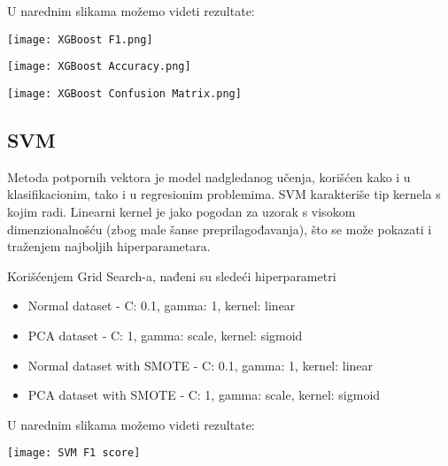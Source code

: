 \documentclass[a4paper]{article}
\begin{document}
        U narednim slikama možemo videti rezultate:

        \begin{center}
            \label{im:XGBoost F1 score}
            \texttt{[image: XGBoost F1.png]}
        \end{center}
        
        \begin{center}
            \label{im:XGBoost Accuracy score}
            \texttt{[image: XGBoost Accuracy.png]}
        \end{center}

        \begin{center}
            \label{im:XGBoost Confusion matrix}
            \texttt{[image: XGBoost Confusion Matrix.png]}
        \end{center}

    \subsection{SVM}
        Metoda potpornih vektora je model nadgledanog učenja, korišćen kako i u klasifikacionim, tako i u regresionim problemima. SVM karakteriše tip kernela s kojim radi. Linearni kernel je jako pogodan za uzorak s visokom dimenzionalnošću (zbog male šanse preprilagođavanja), što se može pokazati i traženjem najboljih hiperparametara.
        \par Korišćenjem Grid Search-a, nađeni su sledeći hiperparametri
        \begin{itemize}
            \item Normal dataset - C: 0.1, gamma: 1, kernel: linear
            \item PCA dataset - C: 1, gamma: scale, kernel: sigmoid
            \item Normal dataset with SMOTE - C: 0.1, gamma: 1, kernel: linear
            \item PCA dataset with SMOTE - C: 1, gamma: scale, kernel: sigmoid
        \end{itemize}

        U narednim slikama možemo videti rezultate:

        \begin{center}
            \label{im:SVM F1 score}
            \texttt{[image: SVM F1 score]}
        \end{center}
        
\end{document}
